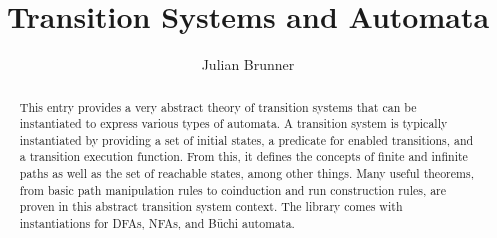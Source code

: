 \documentclass[11pt, a4paper]{article}
\begin{document}
\title{Transition Systems and Automata}
\author{Julian Brunner}

\maketitle

\begin{abstract}
	This entry provides a very abstract theory of transition systems that can be instantiated to express various types of automata.
	A transition system is typically instantiated by providing a set of initial states, a predicate for enabled transitions, and a transition execution function.
	From this, it defines the concepts of finite and infinite paths as well as the set of reachable states, among other things.
	Many useful theorems, from basic path manipulation rules to coinduction and run construction rules, are proven in this abstract transition system context.
	The library comes with instantiations for DFAs, NFAs, and Büchi automata.
\end{abstract}

\tableofcontents


\end{document}
